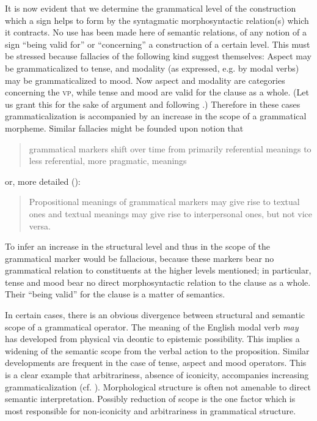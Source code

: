 It is now evident that we determine the grammatical level of the construction which a sign helps to form by the syntagmatic morphosyntactic relation(s) which it contracts. No use has been made here of semantic relations, of any notion of a sign “being valid for” or “concerning” a construction of a certain level. This must be stressed because fallacies of the following kind suggest themselves: Aspect may be grammaticalized to tense, and modality (as expressed, e.g. by modal verbs) may be grammaticalized to mood. Now aspect and modality are categories concerning the \textsc{vp}, while tense and mood are valid for the clause as a whole. (Let us grant this for the sake of argument and following \citet[7]{Bazell1949}.) Therefore in these cases grammaticalization is accompanied by an increase in the scope of a grammatical morpheme. Similar fallacies might be founded upon \citet[47]{Traugott1980} notion that

\begin{quote}
grammatical markers shift over time from primarily referential meanings to less referential, more pragmatic, meanings
\end{quote}

\noindent or, more detailed (\citeyear[47]{Traugott1980}):

\begin{quote}
Propositional meanings of grammatical markers may give rise to textual ones and textual meanings may give rise to interpersonal ones, but not vice versa.
\end{quote}

\noindent To infer an increase in the structural level and thus in the scope of the grammatical marker would be fallacious, because these markers bear no grammatical relation to constituents at the higher levels mentioned; in particular, tense and mood bear no direct morphosyntactic relation to the clause as a whole. Their “being valid” for the clause is a matter of semantics.

In certain cases, there is an obvious divergence between structural and semantic scope of a grammatical operator. The meaning of the English modal verb \textit{may} has developed from physical via deontic to epistemic possibility. This implies a widening of the semantic scope from the verbal action to the proposition. Similar developments are frequent in the case of tense, aspect and mood operators. This is a clear example that arbitrariness, absence of iconicity, accompanies increasing grammaticalization (cf. ). Morphological structure is often not amenable to direct semantic interpretation. Possibly reduction of scope is the one factor which is most responsible for non-iconicity and arbitrariness in grammatical structure.

